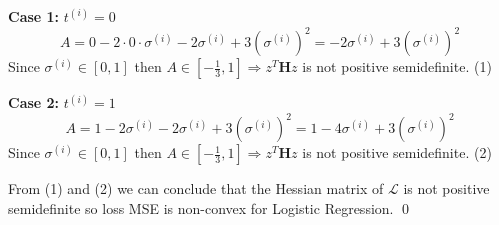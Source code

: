 \documentclass[a4paper, 12pt]{article}  %
\begin{document}
\begin{enumerate}
    \textbf{Case 1:} \(t^{(i)} = 0\)
    \[A = 0 - 2 \cdot 0 \cdot \sigma^{(i)} -2 \sigma^{(i)} + 3(\sigma^{(i)})^2 = -2 \sigma^{(i)} + 3(\sigma^{(i)})^2\]
    Since $\sigma^{(i)} \in [0, 1]$ then $A \in [{-\frac{1}{3}, 1}] \Rightarrow z^T \mathbf{H}z$ is not positive semidefinite. (1)
    
    \textbf{Case 2:} \(t^{(i)} = 1\)
    \[A = 1 - 2\sigma^{(i)} -2 \sigma^{(i)} + 3(\sigma^{(i)})^2 = 1 -4 \sigma^{(i)} + 3(\sigma^{(i)})^2\]
    Since $\sigma^{(i)} \in [0, 1]$ then $A \in [{-\frac{1}{3}, 1}] \Rightarrow z^T \mathbf{H}z$ is not positive semidefinite. (2)
    
    From (1) and (2) we can conclude that the Hessian matrix of $\mathcal{L}$ is not positive semidefinite so loss MSE is non-convex for Logistic Regression. \qed
\end{enumerate}
\end{document}
